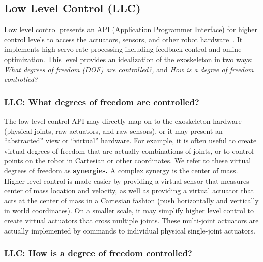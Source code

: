 \documentclass[letterpaper,12pt,fullpage]{article}
\begin{document}
\subsection{Low Level Control (LLC)}

Low level control presents an API (Application Programmer Interface)
for higher control levels
to access the actuators, sensors, and other robot hardware~\cite{IEEE07271219}.
It implements high servo rate processing including feedback control and online
optimization.
This level provides an idealization of the exoskeleton in two ways: 
{\it What degrees of freedom (DOF) are controlled?,} and 
{\it How is a degree of freedom controlled?}

\subsubsection{LLC: What degrees of freedom are controlled?}

The low level control API may directly map on to the exoskeleton hardware
(physical joints,
raw actuators, and raw sensors), or
it may present an ``abstracted'' view or ``virtual'' hardware.
For example, it is often useful to create virtual degrees of freedom that are
actually combinations of joints, or to control points on the robot in Cartesian
or other coordinates. We refer to these virtual degrees of freedom as {\bf synergies.}
A complex synergy is the center of mass. Higher level control is made easier by
providing a virtual sensor that measures center of mass location and velocity,
as well as providing a virtual actuator that acts at the center of mass in
a Cartesian fashion (push horizontally and vertically in world coordinates).
On a smaller scale, it may simplify higher level control 
to create virtual actuators that cross
multiple joints. These multi-joint actuators are actually implemented by commands
to individual physical single-joint actuators.

\subsubsection{LLC: How is a degree of freedom controlled?}
\end{document}
